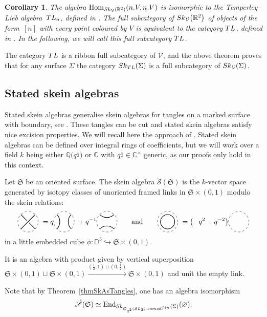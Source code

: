 \documentclass[11pt]{article}
\numberwithin{equation}{section}
\numberwithin{equation}{section}
\newtheorem{Corollary}[Theorem]{Corollary}
\newcommand{\Kaufhoriz}{\begin{tikzpicture}[scale = 0.5, baseline = -3pt]
\draw[dashed] (0,0) circle(1);
\draw[thick] (45:1) arc (-45:-135:1);
\draw[thick] (-45:1) arc (45:135:1);
\end{tikzpicture}}
\newcommand{\Kaufvert}{\begin{tikzpicture}[scale = 0.5, baseline = -3pt]
\draw[dashed] (0,0) circle(1);
\draw[thick] (45:1) arc (135:225:1);
\draw[thick] (135:1) arc (45:-45:1);
\end{tikzpicture}}
\newcommand{\Kauftresse}{\begin{tikzpicture}[scale = 0.5, baseline = -3pt]
\draw[dashed] (0,0) circle(1);
\draw[thick] (-45:1) -- (135:1) node[fill, color= white, pos = 0.5, circle, scale = 0.45]{};
\draw[thick] (45:1) -- (-135:1);
\end{tikzpicture}}
\newcommand{\Kaufcirc}{\begin{tikzpicture}[scale = 0.5, baseline = -3pt]
\draw[dashed] (0,0) circle(1);
\draw[thick] (0,0) circle(0.7);
\end{tikzpicture}}
\newcommand{\Kaufvide}{\begin{tikzpicture}[scale = 0.5, baseline = -3pt]
\draw[dashed] (0,0) circle(1);
\end{tikzpicture}}
\newcommand{\Hom}{\operatorname{Hom}}
\newcommand{\End}{\operatorname{End}}
\newcommand{\Oqcomfin}{\Oq\text{-}{\rm comod}^{\rm fin}}
\newcommand{\Oq}{\mathcal{O}_{q^2}({\rm SL}_2)}
\begin{document}
\begin{Corollary}
The algebra $\Hom_{{\rm Sk}_\mathcal{V}(\mathbb{R}^2)}(n.V,n.V)$ is isomorphic to the Temperley--Lieb algebra~${\rm TL}_n$, defined in {\rm \cite[Section~XII.3]{Turaev}}. The full subcategory of ${\rm Sk}_\mathcal{V}\big(\mathbb{R}^2\big)$ of objects of the form~$[n]$ with every point coloured by $V$ is equivalent to the category ${\rm TL}$, defined in {\rm\cite[Section~XII.2]{Turaev}}. In the following, we will call this full subcategory ${\rm TL}$.
\end{Corollary}

The category ${\rm TL}$ is a ribbon full subcategory of $\mathcal{V}$, and the above theorem proves that for any surface $\Sigma$ the category ${\rm Sk}_{{\rm TL}}(\Sigma)$ is a full subcategory of ${\rm Sk}_\mathcal{V}(\Sigma)$.

\subsection{Stated skein algebras}\label{SectStatedSkein} Stated skein algebras generalise skein algebras for tangles on a marked surface with boundary, see \cite{BonahonWong,TTQLe,Muller}. These tangles can be cut and stated skein algebras satisfy nice excision properties. We will recall here the approach of \cite{Cos}. Stated skein algebras can be defined over integral rings of coefficients, but we will work over a field $k$ being either $\mathbb{Q}\big(q^{\frac{1}{2}}\big)$ or $\mathbb{C}$ with $q^{\frac{1}{2}} \in \mathbb{C}^\times$ generic, as our proofs only hold in this context.

\begin{Definition}
Let $\mathfrak{S}$ be an oriented surface. The skein algebra $\mathring{\mathscr{S}}(\mathfrak{S})$ is the $k$-vector space generated by isotopy classes of unoriented framed links in $\mathfrak{S}\times (0,1)$ modulo the skein relations:
\[ \Kauftresse \ = q \Kaufvert\ +q^{-1} \Kaufhoriz \qquad \text{and} \qquad \Kaufcirc \ = \big({-}q^2-q^{-2}\big) \Kaufvide \]
in a little embedded cube $\phi\colon \mathbb{D}^3 \hookrightarrow \mathfrak{S}\times (0,1)$.

It is an algebra with product given by vertical superposition $\mathfrak{S}\times (0,1) \sqcup \mathfrak{S}\times (0,1) \overset{\left(\frac{1}{2},1\right)\sqcup\left(0,\frac{1}{2}\right)}\longrightarrow \mathfrak{S} \times (0,1)$ and unit the empty link.
\end{Definition}

Note that by Theorem~\ref{thmSkAsTangles}, one has an algebra isomorphism
\[
\mathring{\mathscr{S}}(\mathfrak{S}) \simeq \End_{{\rm Sk}_{\Oqcomfin}(\Sigma)}(\varnothing).
\]
\end{document}
